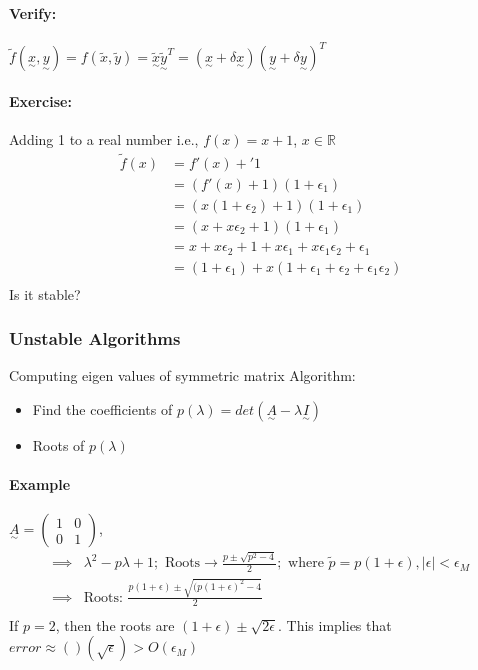 \documentclass{article}
\newcommand{\T}[1]{\underset{\sim}{#1}}
\begin{document}
\paragraph{Verify:} $\tilde{f}(\T{x}, \T{y}) = f(\tilde{x}, \tilde{y}) = \T{\tilde{x}}\T{\tilde{y}}^T = (\T{x} + \delta \T{x})(\T{y} + \delta \T{y})^T$

\paragraph{Exercise:} Adding 1 to a real number i.e., $f(x) = x + 1$, $x \in \mathbb{R}$
\begin{align*}
  \tilde{f}(x) &= f'(x) +' 1\\
               &= (f'(x) + 1)(1 + \epsilon_1)\\
               &= (x(1 + \epsilon_2) + 1)(1 + \epsilon_1)\\
               &= (x + x\epsilon_2 + 1)(1 + \epsilon_1)\\
               &= x + x\epsilon_2 + 1 + x\epsilon_1 + x\epsilon_1\epsilon_2 + \epsilon_1\\
               &= (1 + \epsilon_1) + x(1 + \epsilon_1 + \epsilon_2 + \epsilon_1\epsilon_2)\\
\end{align*}
Is it stable?

\subsubsection{Unstable Algorithms}
\label{sec:unstable-algorithms}

Computing eigen values of symmetric matrix
Algorithm:
\begin{itemize}
\item Find the coefficients of $p(\lambda) = det(\T{A}-\lambda \T{I})$
\item Roots of $p(\lambda)$
\end{itemize}

\paragraph{Example} $\T{A} = \begin{pmatrix} 1&0\\0&1 \end{pmatrix}$,
\begin{align*}
  \implies & \lambda^2 - p\lambda + 1; \text{ Roots} \rightarrow \frac{p \pm \sqrt{p^2 - 4}}{2};
             \text{ where }\tilde{p} = p(1 + \epsilon), |\epsilon| < \epsilon_M\\
  \implies & \text{Roots: } \frac{p(1 + \epsilon) \pm \sqrt{(p(1 + \epsilon)^2 - 4}}{2}\\
\end{align*}
If $p = 2$, then the roots are $(1 + \epsilon) \pm \sqrt{2\epsilon}$. This implies that $error \approx ()(\sqrt{\epsilon}) > O(\epsilon_M)$
\end{document}
